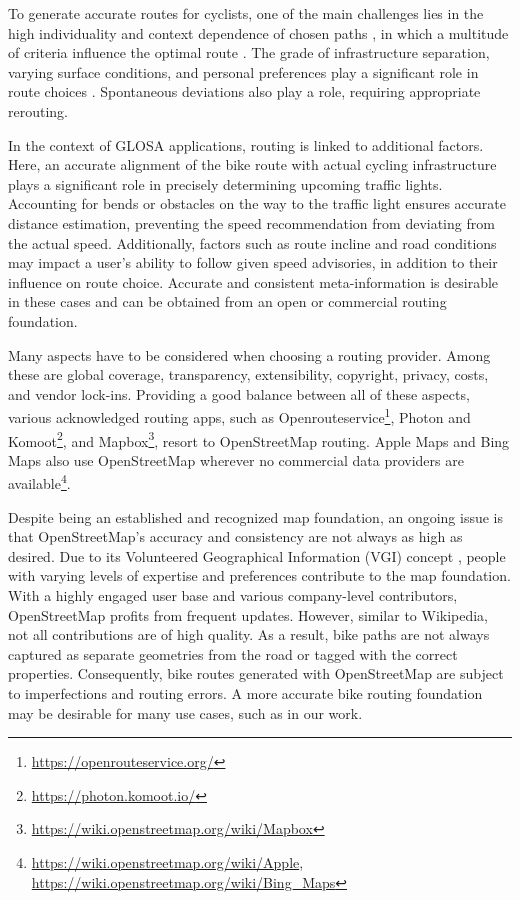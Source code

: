 To generate accurate routes for cyclists, one of the main challenges lies in the high individuality and context dependence of chosen paths \cite{dill_revisiting_2016, schleinitz_german_2017, misra_modeling_2018}, in which a multitude of criteria influence the optimal route \cite{song_exploring_2014, arellana_developing_2020}. The grade of infrastructure separation, varying surface conditions, and personal preferences play a significant role in route choices \cite{hardinghaus_attractive_2022}. Spontaneous deviations also play a role, requiring appropriate rerouting.

In the context of GLOSA applications, routing is linked to additional factors. Here, an accurate alignment of the bike route with actual cycling infrastructure plays a significant role in precisely determining upcoming traffic lights. Accounting for bends or obstacles on the way to the traffic light ensures accurate distance estimation, preventing the speed recommendation from deviating from the actual speed. Additionally, factors such as route incline and road conditions may impact a user's ability to follow given speed advisories, in addition to their influence on route choice. Accurate and consistent meta-information is desirable in these cases and can be obtained from an open or commercial routing foundation.

Many aspects have to be considered when choosing a routing provider. Among these are global coverage, transparency, extensibility, copyright, privacy, costs, and vendor lock-ins. Providing a good balance between all of these aspects, various acknowledged routing apps, such as Openrouteservice\footnote{\url{https://openrouteservice.org/}}, Photon and Komoot\footnote{\url{https://photon.komoot.io/}}, and Mapbox\footnote{\url{https://wiki.openstreetmap.org/wiki/Mapbox}}, resort to OpenStreetMap routing. Apple Maps and Bing Maps also use OpenStreetMap wherever no commercial data providers are available\footnote{\url{https://wiki.openstreetmap.org/wiki/Apple}, \url{https://wiki.openstreetmap.org/wiki/Bing_Maps}}. 

Despite being an established and recognized map foundation, an ongoing issue is that Open\allowbreak Street\allowbreak Map's accuracy and consistency are not always as high as desired. Due to its Volunteered Geographical Information (VGI) concept \cite{wasserman_evaluating_2019, jacobs_openstreetmap_2020, vybornova_automated_2023}, people with varying levels of expertise and preferences contribute to the map foundation. With a highly engaged user base and various company-level contributors, OpenStreetMap profits from frequent updates. However, similar to Wikipedia, not all contributions are of high quality. As a result, bike paths are not always captured as separate geometries from the road or tagged with the correct properties. Consequently, bike routes generated with OpenStreetMap are subject to imperfections and routing errors. A more accurate bike routing foundation may be desirable for many use cases, such as in our work.

